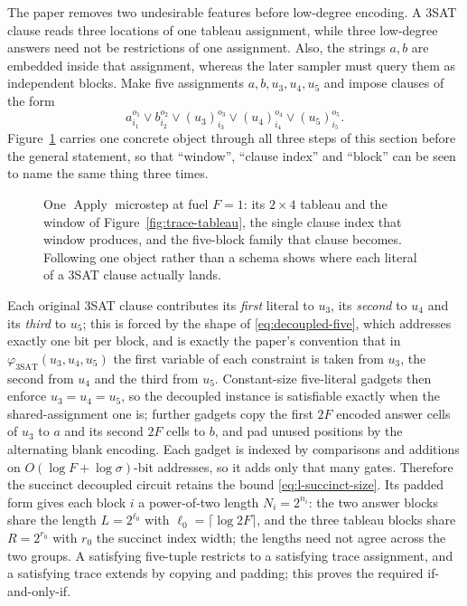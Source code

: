The paper removes two undesirable features before low-degree encoding.  A
3SAT clause reads three locations of one tableau assignment, while three
low-degree answers need not be restrictions of one assignment.  Also, the
strings \(a,b\) are embedded inside that assignment, whereas the later sampler
must query them as independent blocks.  Make five assignments
\(a,b,u_3,u_4,u_5\) and impose clauses of the form
\[
 a_{i_1}^{o_1}\vee b_{i_2}^{o_2}\vee
 (u_3)_{i_3}^{o_3}\vee (u_4)_{i_4}^{o_4}\vee
 (u_5)_{i_5}^{o_5}.
\tag{11.2}\label{eq:decoupled-five}
\]
Figure~\ref{fig:miniature} carries one concrete object through all three
steps of this section before the general statement, so that ``window'',
``clause index'' and ``block'' can be seen to name the same thing three times.
\begin{figure}[H]
\centering

\caption{One \(\operatorname{Apply}\) microstep at fuel \(F=1\): its \(2\times4\) tableau and the window of Figure~\ref{fig:trace-tableau}, the single clause index that window produces, and the five-block family that clause becomes.  Following one object rather than a schema shows where each literal of a 3SAT clause actually lands.}
\label{fig:miniature}
\end{figure}

Each original 3SAT clause contributes its \emph{first} literal to \(u_3\), its
\emph{second} to \(u_4\) and its \emph{third} to \(u_5\); this is forced by the
shape of \eqref{eq:decoupled-five}, which addresses exactly one bit per block,
and is exactly the paper's convention that in
\(\varphi_{\mathrm{3SAT}}(u_3,u_4,u_5)\) the first variable of each constraint
is taken from \(u_3\), the second from \(u_4\) and the third from \(u_5\).
Constant-size five-literal gadgets then enforce \(u_3=u_4=u_5\), so the
decoupled instance is satisfiable exactly when the shared-assignment one is;
further gadgets copy the first \(2F\) encoded answer cells of \(u_3\) to
\(a\) and its second \(2F\) cells to \(b\), and pad unused positions by the
alternating blank encoding.  Each
gadget is indexed by comparisons and additions on
\(O(\log F+\log\sigma)\)-bit addresses, so it adds only that many gates.
Therefore the succinct decoupled circuit retains the bound
\eqref{eq:l-succinct-size}.  Its padded form gives each block \(i\) a
power-of-two length \(N_i=2^{n_i}\): the two answer blocks share the length
\(L=2^{\ell_0}\) with \(\ell_0=\lceil\log 2F\rceil\), and the three tableau
blocks share \(R=2^{r_0}\) with \(r_0\) the succinct index width; the lengths
need not agree across the two groups.  A satisfying five-tuple restricts to a
satisfying trace assignment, and a satisfying trace extends by copying and
padding; this proves the required if-and-only-if.

